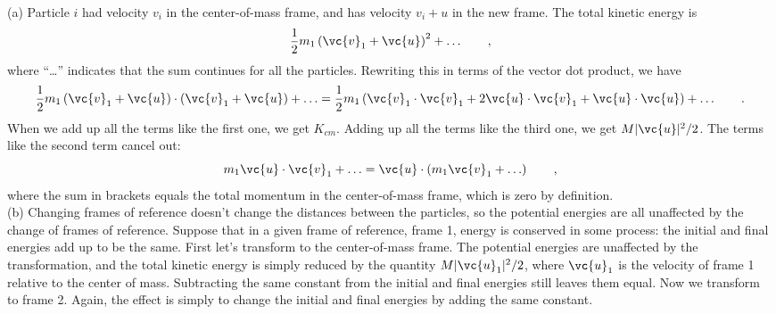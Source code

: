 (a) Particle $i$ had velocity $v_i$ in the center-of-mass
frame, and has velocity $v_i+u$ in the new frame. The
total kinetic energy is
\begin{equation*}
 \frac{1}{2}m_1\left(\vc{v}_1+\vc{u}\right)^2+\ldots \qquad ,
\end{equation*}
where ``\ldots'' indicates that the sum continues for all the
particles. Rewriting this in terms of the vector dot product, we have
\begin{equation*}
 \frac{1}{2}m_1\left(\vc{v}_1+\vc{u}\right)\cdot\left(\vc{v}_1+\vc{u}\right)+\ldots
 = \frac{1}{2}m_1\left(\vc{v}_1\cdot\vc{v}_1+2\vc{u}\cdot\vc{v}_1+\vc{u}\cdot\vc{u}\right) + \ldots\qquad .
\end{equation*}
When we add up all the terms like the first one, we get
$K_{cm}$. Adding up all the terms like the third one, we get
$M|\vc{u}|^2/2$. The terms like the second term cancel out:
\begin{equation*}
  m_1\vc{u}\cdot\vc{v}_1 + \ldots
			 =     \vc{u}\cdot\left(m_1\vc{v}_1+\ldots\right)\qquad   ,  
\end{equation*}
where the sum in brackets equals the total momentum in the
center-of-mass frame, which is zero by definition.\\
(b) Changing frames of reference doesn't change the distances
between the particles, so the potential energies are all
unaffected by the change of frames of reference. Suppose
that in a given frame of reference, frame 1, energy is
conserved in some process: the initial and final energies
add up to be the same. First let's transform to the
center-of-mass frame. The potential energies are unaffected
by the transformation, and the total kinetic energy is
simply reduced by the quantity $M |\vc{u}_1|^2/2$, where $\vc{u}_1$ is
the velocity of frame 1 relative to the center of mass.
Subtracting the same constant from the initial and final
energies still leaves them equal. Now we transform to frame
2. Again, the effect is simply to change the initial and
final energies by adding the same constant.



